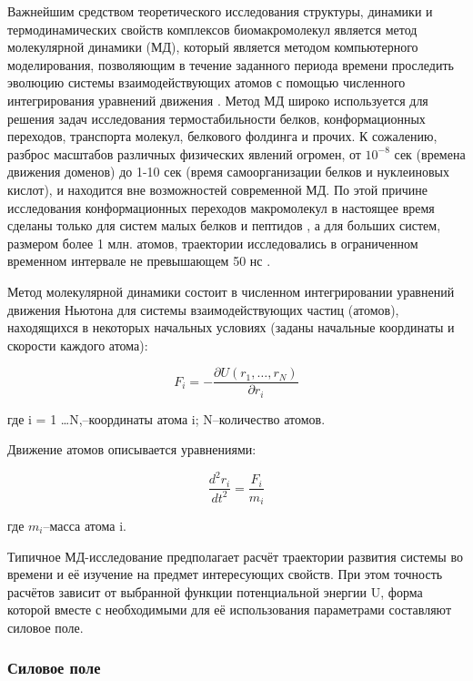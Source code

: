 Важнейшим средством теоретического исследования структуры, динамики и термодинамических свойств комплексов биомакромолекул является метод молекулярной динамики (МД), который является методом компьютерного моделирования, позволяющим в течение заданного периода времени проследить эволюцию системы взаимодействующих атомов с помощью численного интегрирования уравнений движения \cite{Alder1959,Gibson1960}. Метод МД широко используется для решения задач исследования термостабильности белков, конформационных переходов, транспорта молекул, белкового фолдинга и прочих. К сожалению, разброс масштабов различных физических явлений огромен, от $10^{-8}$ сек (времена движения доменов) до 1-10 сек (время самоорганизации белков и нуклеиновых кислот), и находится вне возможностей современной МД. По этой причине исследования конформационных переходов макромолекул в настоящее время сделаны только для систем малых белков и пептидов \cite{Zhou2002,Nymeyer2003}, а для больших систем, размером более 1 млн. атомов, траектории исследовались в ограниченном временном интервале не превышающем 50 нс \cite{Freddolino2006}. 

Метод молекулярной динамики состоит в численном интегрировании уравнений движения Ньютона для системы взаимодействующих частиц (атомов), находящихся в некоторых начальных условиях (заданы начальные координаты и скорости каждого атома):

\[
F_i = -\frac{\partial U(r_1,\ldots,r_N)}{\partial r_i}
\]

где i = 1 \ldots N,--координаты атома i; N--количество атомов.

Движение атомов описывается уравнениями:

\begin{equation}
\label{eq:newton_motion}
\frac{d^2r_i}{dt^2}=\frac{F_i}{m_i}
\end{equation}

где $m_i$--масса атома i.

Типичное МД-исследование предполагает расчёт траектории развития системы во времени и её изучение на предмет интересующих свойств. При этом точность расчётов зависит от выбранной функции потенциальной энергии U, форма которой вместе с необходимыми для её использования параметрами составляют силовое поле. 

\subsubsection{Силовое поле} \label{sect_methods_forcefield}

